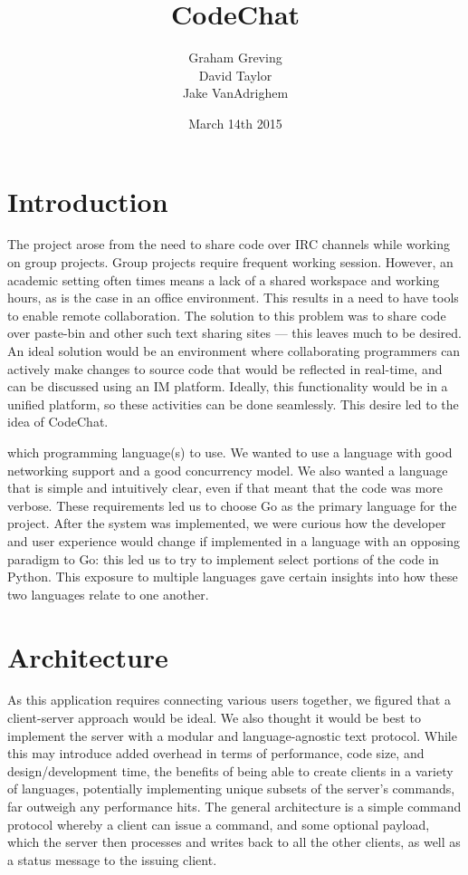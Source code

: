 \documentclass[10pt, letterpaper]{article}
\title{CodeChat}
\author{Graham Greving \\ David Taylor \\ Jake VanAdrighem}
\date{March 14th 2015}
\begin{document}
\maketitle

\section*{Introduction}

The project arose from the need to share code over IRC channels while working 
on group projects. Group projects require frequent working session. However, 
an academic setting often times means a lack of a shared workspace and 
working hours, as is the case in an office environment. This results in a 
need to have tools to enable remote collaboration. The solution to this 
problem was to share code over paste-bin and other such text sharing sites 
--- this leaves much to be desired. An ideal solution would be an environment 
where collaborating programmers can actively make changes to source code that 
would be reflected in real-time, and can be discussed using an IM platform. 
Ideally, this functionality would be in a unified platform, so these 
activities can be done seamlessly. This desire led to the idea of CodeChat.

which programming language(s) to use. We wanted to use a language with good 
networking support and a good concurrency model. We also wanted a language 
that is simple and intuitively clear, even if that meant that the code was 
more verbose. These requirements led us to choose Go as the primary language 
for the project. After the system was implemented, we were curious how the 
developer and user experience would change if implemented in a language with 
an opposing paradigm to Go: this led us to try to implement select portions 
of the code in Python. This exposure to multiple languages gave certain 
insights into how these two languages relate to one another.

\section*{Architecture}

As this application requires connecting various users together, we figured 
that a client-server approach would be ideal. We also thought it would be 
best to implement the server with a modular and language-agnostic text 
protocol. While this may introduce added overhead in terms of performance, 
code size, and design/development time, the benefits of being able to create 
clients in a variety of languages, potentially implementing unique 
subsets of the server's commands, far outweigh any performance hits. The 
general architecture is a simple command protocol whereby a client can 
issue a command, and some optional payload, which the server then processes  
and writes back to all the other clients, as well as a status message to the 
issuing client.
\end{document}
